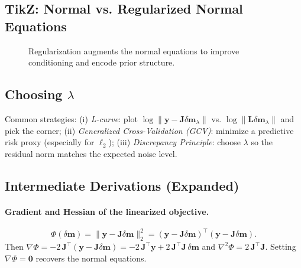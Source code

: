 \subsection{TikZ: Normal vs. Regularized Normal Equations}
\begin{figure}[h!]
\centering
{}
\caption{Regularization augments the normal equations to improve conditioning and encode prior structure.}
\end{figure}

\subsection{Choosing \texorpdfstring{$\lambda$}{lambda}}
Common strategies: (i) \emph{L-curve}: plot $\log \|\mathbf{y}-\mathbf{J}\delta\mathbf{m}_\lambda\|$ vs. $\log \|\mathbf{L}\delta\mathbf{m}_\lambda\|$ and pick the corner; (ii) \emph{Generalized Cross-Validation (GCV)}: minimize a predictive risk proxy (especially for $\ell_2$); (iii) \emph{Discrepancy Principle}: choose $\lambda$ so the residual norm matches the expected noise level.

\subsection{Intermediate Derivations (Expanded)}
\paragraph{Gradient and Hessian of the linearized objective.}
\[
\Phi(\delta\mathbf{m}) = \|\mathbf{y}-\mathbf{J}\delta\mathbf{m}\|_2^2
= (\mathbf{y}-\mathbf{J}\delta\mathbf{m})^\top(\mathbf{y}-\mathbf{J}\delta\mathbf{m}).
\]
Then $\nabla \Phi = -2\,\mathbf{J}^\top (\mathbf{y}-\mathbf{J}\delta\mathbf{m}) = -2\,\mathbf{J}^\top \mathbf{y} + 2\,\mathbf{J}^\top\mathbf{J}\,\delta\mathbf{m}$ and $\nabla^2 \Phi = 2\,\mathbf{J}^\top \mathbf{J}$. Setting $\nabla\Phi=\mathbf{0}$ recovers the normal equations.

